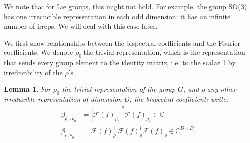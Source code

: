 \documentclass{article}
\newtheorem{lemma}{Lemma}
\begin{document}
We note that for Lie groups, this might not hold. For example, the group SO(3) has one irreducible representation in each odd dimension: it has an infinite number of irreps. We will deal with this case later.

We first show relationships between the bispectral coefficients and the Fourier coefficients. We denote $\rho_0$ the trivial representation, which is the representation that sends every group element to the identity matrix, i.e. to the scalar 1 by irreducibility of the $\rho$'s.

\begin{lemma}\label{lem:coefs}
    For $\rho_0$ the trivial representation of the group $G$, and $\rho$ any other irreducible representation of dimension $D$, the bispectral coefficients write:
    \begin{align*}
    \beta_{\rho_0, \rho_0}
    &= |\mathcal{F}(f)_{\rho_0}|^2 \mathcal{F}(f)_{\rho_0}
    \in \mathbb{C}\\
    \beta_{\rho, \rho_0}
    &= \mathcal{F}(f)_{\rho_0}^\dagger
    \mathcal{F}(f)_{\rho}^\dagger\mathcal{F}(f)_{\rho}
    \in \mathbb{C}^{D \times D}.
    \end{align*}
\end{lemma}
\end{document}
